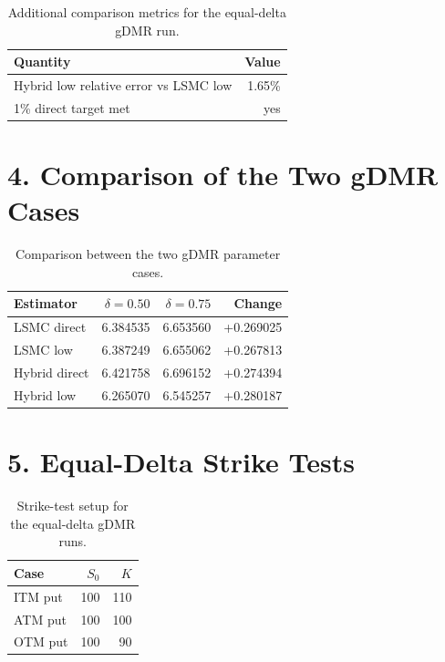 \documentclass[11pt]{article}
\begin{document}
\begin{table}[ht]
\centering
\caption{Additional comparison metrics for the equal-delta gDMR run.}
\begin{tabular}{lr}
\toprule
Quantity & Value \\
\midrule
Hybrid low relative error vs LSMC low & 1.65\% \\
1\% direct target met & yes \\
\bottomrule
\end{tabular}
\end{table}

\section*{4. Comparison of the Two gDMR Cases}

\begin{table}[ht]
\centering
\caption{Comparison between the two gDMR parameter cases.}
\begin{tabular}{lrrr}
\toprule
Estimator & $\delta=0.50$ & $\delta=0.75$ & Change \\
\midrule
LSMC direct   & 6.384535 & 6.653560 & +0.269025 \\
LSMC low      & 6.387249 & 6.655062 & +0.267813 \\
Hybrid direct & 6.421758 & 6.696152 & +0.274394 \\
Hybrid low    & 6.265070 & 6.545257 & +0.280187 \\
\bottomrule
\end{tabular}
\end{table}

\section*{5. Equal-Delta Strike Tests}

\begin{table}[ht]
\centering
\caption{Strike-test setup for the equal-delta gDMR runs.}
\begin{tabular}{lrr}
\toprule
Case & $S_0$ & $K$ \\
\midrule
ITM put & 100 & 110 \\
ATM put & 100 & 100 \\
OTM put & 100 & 90 \\
\bottomrule
\end{tabular}
\end{table}
\end{document}
